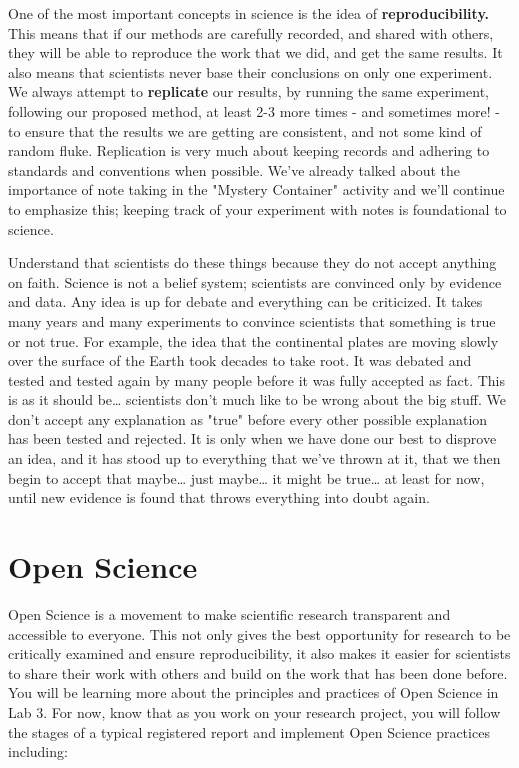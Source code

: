 \documentclass[
]{book}
\begin{document}
One of the most important concepts in science is the idea of \textbf{reproducibility.} This means that if our methods are carefully recorded, and shared with others, they will be able to reproduce the work that we did, and get the same results. It also means that scientists never base their conclusions on only one experiment. We always attempt to \textbf{replicate} our results, by running the same experiment, following our proposed method, at least 2-3 more times - and sometimes more! - to ensure that the results we are getting are consistent, and not some kind of random fluke. Replication is very much about keeping records and adhering to standards and conventions when possible. We've already talked about the importance of note taking in the "Mystery Container" activity and we'll continue to emphasize this; keeping track of your experiment with notes is foundational to science.

Understand that scientists do these things because they do not accept anything on faith. Science is not a belief system; scientists are convinced only by evidence and data. Any idea is up for debate and everything can be criticized. It takes many years and many experiments to convince scientists that something is true or not true. For example, the idea that the continental plates are moving slowly over the surface of the Earth took decades to take root. It was debated and tested and tested again by many people before it was fully accepted as fact. This is as it should be\ldots{} scientists don't much like to be wrong about the big stuff. We don't accept any explanation as "true" before every other possible explanation has been tested and rejected. It is only when we have done our best to disprove an idea, and it has stood up to everything that we've thrown at it, that we then begin to accept that maybe\ldots{} just maybe\ldots{} it might be true\ldots{} at least for now, until new evidence is found that throws everything into doubt again.

\hypertarget{open-science}{%
\section*{Open Science}\label{open-science}}

Open Science is a movement to make scientific research transparent and accessible to everyone. This not only gives the best opportunity for research to be critically examined and ensure reproducibility, it also makes it easier for scientists to share their work with others and build on the work that has been done before. You will be learning more about the principles and practices of Open Science in Lab 3. For now, know that as you work on your research project, you will follow the stages of a typical registered report and implement Open Science practices including:
\end{document}
